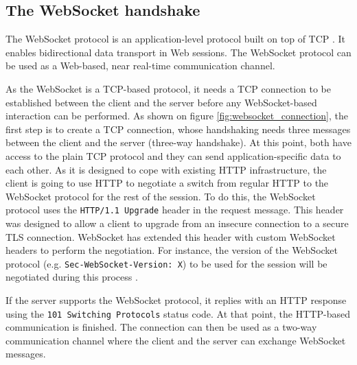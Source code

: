 \documentclass[10pt,journal,compsoc]{IEEEtran}
\newcommand{\ttt}[1]{\texttt{#1}}
\newcommand{\ws}{WebSocket}
\begin{document}


\subsection{The \ws{} handshake}
\label{handshake}
The \ws{} protocol is an application-level protocol built on top of TCP \cite{rfc6455}.
It enables bidirectional data transport in Web sessions.
The \ws{} protocol can be used as a Web-based, near real-time communication channel. %

As the \ws{} is a TCP-based protocol, it needs a TCP connection to be established between the client and the server before any \ws-based interaction can be performed.
As shown on figure \ref{fig:websocket_connection}, the first step is to create a TCP connection, whose handshaking needs three messages between the client and the server (three-way handshake).
At this point, both have access to the plain TCP protocol and they can send application-specific data to each other.
As it is designed to cope with existing HTTP infrastructure, the client is going to use HTTP to negotiate a switch from regular HTTP to the \ws{} protocol for the rest of the session. %
To do this, the \ws{} protocol uses the \ttt{\mbox{HTTP/1.1} Upgrade} header in the request message. %
This header was designed to allow a client to upgrade from an insecure connection to a secure TLS connection. %
\ws{} has extended this header with custom \ws{} headers to perform the negotiation. For instance, the version of the \ws{} protocol (e.g. \ttt{Sec-WebSocket-Version: X}) to be used for the session will be negotiated during this process \cite{HighPerfBrowserNetworking:websocket}.

If the server supports the \ws{} protocol, it replies with an HTTP response using the \ttt{101 Switching Protocols} status code. %
At that point, the HTTP-based communication is finished. %
The connection can then be used as a two-way communication channel where the client and the server can exchange \ws{} messages.
\end{document}
